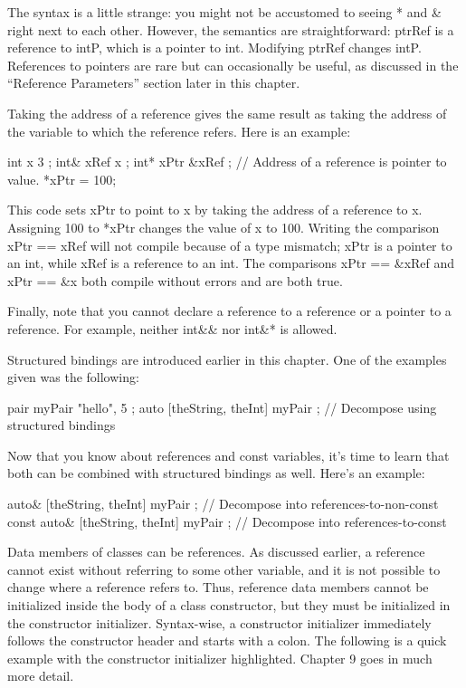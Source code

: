 The syntax is a little strange: you might not be accustomed to seeing * and \& right next to each other. However, the semantics are straightforward: ptrRef is a reference to intP, which is a pointer to int. Modifying ptrRef changes intP. References to pointers are rare but can occasionally be useful, as discussed in the “Reference Parameters” section later in this chapter.

Taking the address of a reference gives the same result as taking the address of the variable to which the reference refers. Here is an example:

\begin{cpp}
int x { 3 };
int& xRef { x };
int* xPtr { &xRef }; // Address of a reference is pointer to value.
*xPtr = 100;
\end{cpp}

This code sets xPtr to point to x by taking the address of a reference to x. Assigning 100 to *xPtr changes the value of x to 100. Writing the comparison xPtr == xRef will not compile because of a type mismatch; xPtr is a pointer to an int, while xRef is a reference to an int. The comparisons xPtr == \&xRef and xPtr == \&x both compile without errors and are both true.

Finally, note that you cannot declare a reference to a reference or a pointer to a reference. For example, neither int\&\& nor int\&* is allowed.


Structured bindings are introduced earlier in this chapter. One of the examples given was the following:

\begin{cpp}
pair myPair { "hello", 5 };
auto [theString, theInt] { myPair }; // Decompose using structured bindings
\end{cpp}

Now that you know about references and const variables, it’s time to learn that both can be combined with structured bindings as well. Here’s an example:

\begin{cpp}
auto& [theString, theInt] { myPair }; // Decompose into references-to-non-const
const auto& [theString, theInt] { myPair }; // Decompose into references-to-const
\end{cpp}


Data members of classes can be references. As discussed earlier, a reference cannot exist without referring to some other variable, and it is not possible to change where a reference refers to. Thus, reference data members cannot be initialized inside the body of a class constructor, but they must be initialized in the constructor initializer. Syntax-wise, a constructor initializer immediately follows the constructor header and starts with a colon. The following is a quick example with the constructor initializer highlighted. Chapter 9 goes in much more detail.

